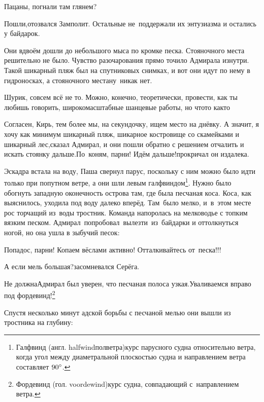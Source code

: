 \diagdash Пацаны, погнали там глянем?

\diagdash Пошли,\mdash отозвался Замполит. Остальные не~поддержали их энтузиазма и остались у байдарок.

Они вдвоём дошли до небольшого мыса по кромке песка. Стояночного места решительно не было. Чувство разочарования прямо точило Адмирала изнутри. Такой шикарный пляж был на спутниковых снимках, и вот они идут по нему в гидроносках, а стояночного места\mdash ну~никак нет.

\diagdash Шурик, совсем всё не то. Можно, конечно, теоретически, провести, как ты любишь говорить, широкомасштабные шанцевые работы, но что\sdash то как\sdash то\myldots{}

\diagdash Согласен, Кирь, тем более мы, на секундочку, ищем место на днёвку. А значит, я хочу как минимум шикарный пляж, шикарное костровище со скамейками и шикарный лес,\mdash сказал Адмирал, и они пошли обратно с решением отчалить и искать стоянку дальше.\mdash По~коням, парни! Идём дальше!\mdash прокричал он издалека.

\renewcommand*{\thefootnote}{\fnsymbol{footnote}}
\setcounter{footnote}{0}
Эскадра встала на воду, Паша свернул парус, поскольку с ним можно было идти только при попутном ветре, а они шли левым галфвиндом\footnote{Галфвинд (англ. halfwind\mdash полветра)\mdash курс парусного судна относительно ветра, когда угол между диаметральной плоскостью судна и направлением ветра составляет $90\degree$.}. Нужно было обогнуть западную оконечность острова там, где была песчаная коса. Коса, как выяснилось, уходила под воду далеко вперёд. Там~было мелко, и~в~этом месте рос торчащий из~воды тростник. Команда напоролась на мелководье с топким вязким песком. Адмирал~попробовал~вылезти~из~байдарки и оттолкнуться ногой, но она ушла в зыбучий песок:

\diagdash Попадос, парни! Копаем вёслами активно! Отталкивайтесь от~песка!!!

\diagdash А если мель большая?\mdash засомневался Серёга.

\renewcommand*{\thefootnote}{\fnsymbol{footnote}}
\setcounter{footnote}{0}
\diagdash Не должна\myldots{}\mdash Адмирал был уверен, что песчаная полоса узкая.\mdash Уваливаемся вправо под фордевинд!\footnote{Фордевинд (гол. voordewind)\mdash курс судна, совпадающий с~направлением ветра.}

Спустя несколько минут адской борьбы с песчаной мелью они вышли из тростника на глубину:

